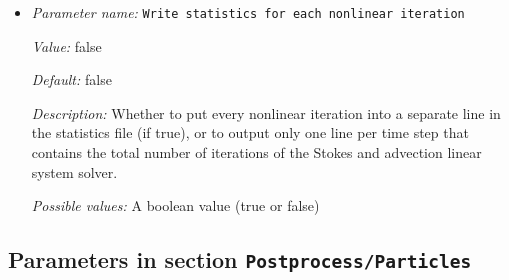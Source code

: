 \begin{itemize}
\item {\it Parameter name:} {\tt Write statistics for each nonlinear iteration}
\label{parameters:Postprocess/Global statistics/Write statistics for each nonlinear iteration}


{\it Value:} false


{\it Default:} false


{\it Description:} Whether to put every nonlinear iteration into a separate line in the statistics file (if true), or to output only one line per time step that contains the total number of iterations of the Stokes and advection linear system solver.


{\it Possible values:} A boolean value (true or false)
\end{itemize}

\subsection{Parameters in section \tt Postprocess/Particles}
\label{parameters:Postprocess/Particles}

